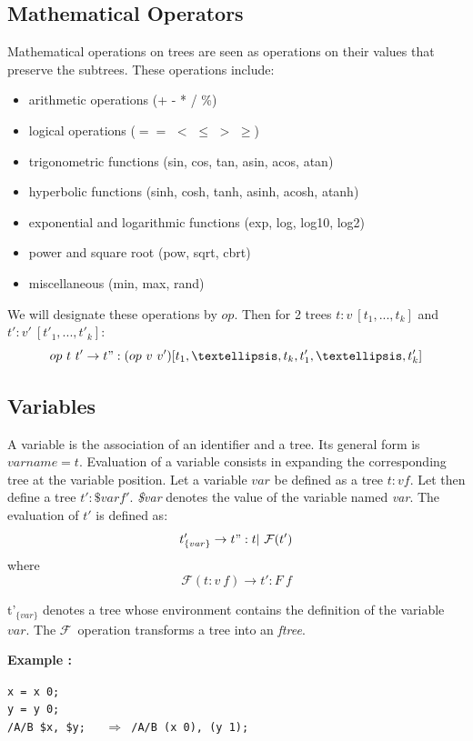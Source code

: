 \documentclass[runningheads]{llncs}
\newcommand{\exemple}	{\vspace*{1mm}\hspace*{-4mm}\textbf{Example :}}
\newcommand{\code}	[2][0.9]	{\vspace{0mm}\begin{center}\colorbox{mygrey}{
							\begin{minipage}[t]{#1\columnwidth} 
							{\small \texttt{#2}}
							\end{minipage}}\end{center}}
\newcommand{\llist}	[1]		{\ensuremath{[#1_1,...,#1_k]}}
\newcommand{\seq}		{\ensuremath{|}}
\newcommand{\foret}		{\ensuremath{F}}
\newcommand{\toforet}	{\ensuremath{\mathcal{F}}}
\newcommand{\binop}		{\ensuremath{op}}
\newcommand{\ftree}		{ftree}
\newcommand{\etc}		{\ensuremath{…}}
\begin{document}
\subsection{Mathematical Operators}

Mathematical operations on trees are seen as operations on their values that preserve the subtrees. These operations include:
\begin{itemize}
\item arithmetic operations (+ - * / \%)
\item logical operations ($==$ $<$ $\leq$ $>$ $\geq$)
\item trigonometric functions (sin, cos, tan, asin, acos, atan)
\item hyperbolic functions (sinh, cosh, tanh, asinh, acosh, atanh)
\item exponential and logarithmic functions (exp, log, log10, log2)
\item power and square root (pow, sqrt, cbrt)
\item miscellaneous  (min, max, rand)
\end{itemize}

We will designate these operations by \binop. Then for 2 trees $t : v\ \llist{t}$ and $t' : v'\ \llist{t'}$:
\[
	\binop\ t\ t'  \to  t":  (\binop\ v\ v') [ t_1,\etc,t_k,t'_1,\etc,t'_k ]
\]

\subsection{Variables}

A variable is the association of an identifier and a tree. Its general form is
$varname = t$.
Evaluation of a variable consists in expanding the corresponding tree at the variable position.
Let a variable $var$ be defined as a tree $t : v f$.
Let then define a tree $t' : \$var f'$.
\emph{\$var} denotes the value of the variable named \emph{var}. The evaluation of $t'$ is defined as:
\[
	t'_{\{var\}}  \to t" : t \seq\ \toforet(t')
\]
where
\[
	\toforet(t : v\ f)  \to t' : \foret\ f
\]

t'$_{\{var\}}$ denotes a tree whose environment contains the definition of the variable $var$. The \toforet\ operation transforms a tree into an \emph{\ftree}.


\exemple
\code{x = x 0;\\
y = y 0;\\
/A/B \$x, \$y; \ \ $\Rightarrow$  /A/B (x 0), (y 1);}
\end{document}
